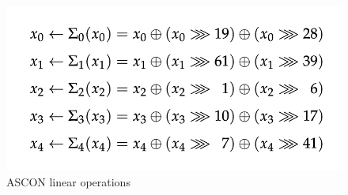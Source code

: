 \begin{figure}
    \centering
    \includegraphics[scale = 0.8]{ascon_sbox/ascon_linear.png}
    \caption{ASCON linear operations}
    \label{fig:ascon_linear}
\end{figure}
